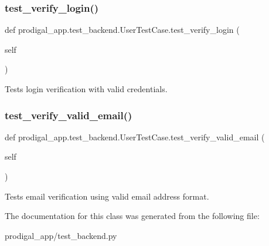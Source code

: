 \subsubsection{\texorpdfstring{test\+\_\+verify\+\_\+login()}{test\_verify\_login()}}
{\footnotesize\ttfamily def prodigal\+\_\+app.\+test\+\_\+backend.\+User\+Test\+Case.\+test\+\_\+verify\+\_\+login (\begin{DoxyParamCaption}\item[{}]{self }\end{DoxyParamCaption})}

\begin{DoxyVerb}Tests login verification with valid credentials.
\end{DoxyVerb}
 \mbox{\label{classprodigal__app_1_1test__backend_1_1_user_test_case_adb1ca421e78a76b4530658b96632e0a6}} 
\subsubsection{\texorpdfstring{test\+\_\+verify\+\_\+valid\+\_\+email()}{test\_verify\_valid\_email()}}
{\footnotesize\ttfamily def prodigal\+\_\+app.\+test\+\_\+backend.\+User\+Test\+Case.\+test\+\_\+verify\+\_\+valid\+\_\+email (\begin{DoxyParamCaption}\item[{}]{self }\end{DoxyParamCaption})}

\begin{DoxyVerb}Tests email verification using valid email address format.
\end{DoxyVerb}
 

The documentation for this class was generated from the following file\+:\begin{DoxyCompactItemize}
\item 
prodigal\+\_\+app/test\+\_\+backend.\+py\end{DoxyCompactItemize}
